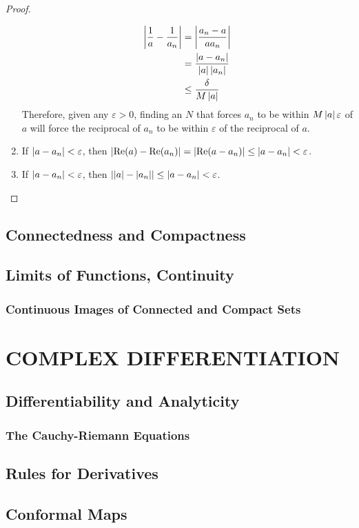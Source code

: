 \documentclass{refbook}
\begin{document}
\begin{proof}
\begin{enumerate}
\begin{align*}
\left\lvert \frac{1}{a}-\frac{1}{a_n} \right\rvert &= \left\lvert \frac{a_n-a}{aa_n} \right\rvert\\
&= \frac{\left\lvert a-a_n \right\rvert}{\left\lvert a \right\rvert{\left\lvert a_n \right\rvert}}\\
&\leq \frac{\delta}{M\left\lvert a \right\rvert}
\end{align*}
Therefore, given any $\varepsilon > 0$, finding an $N$ that forces $a_n$ to be within $M\left\lvert a \right\rvert\varepsilon$ of $a$ will force the reciprocal of $a_n$ to be within $\varepsilon$ of the reciprocal of $a$.
\item If $\left\lvert a-a_n \right\rvert < \varepsilon$, then $\left\lvert \operatorname{Re}({a})-\operatorname{Re}({a_n}) \right\rvert = \left\lvert \operatorname{Re}({a-a_n}) \right\rvert \leq \left\lvert a-a_n \right\rvert < \varepsilon$.
\item If $\left\lvert a-a_n \right\rvert < \varepsilon$, then $\left\lvert \left\lvert a \right\rvert-\left\lvert a_n \right\rvert \right\rvert \leq \left\lvert a-a_n \right\rvert < \varepsilon$.
\end{enumerate}
\end{proof}
\subsection{Connectedness and Compactness}
\subsection{Limits of Functions, Continuity}
\subsubsection{Continuous Images of Connected and Compact Sets}


\section{COMPLEX DIFFERENTIATION}
\subsection{Differentiability and Analyticity}
\subsubsection{The Cauchy-Riemann Equations}
\subsection{Rules for Derivatives}
\subsection{Conformal Maps}
\end{document}
